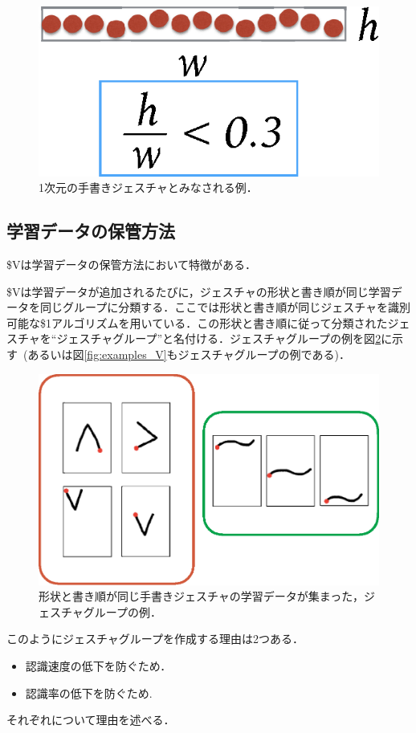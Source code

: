 \begin{figure} [h!]
	\begin{center}
		\includegraphics [width=0.3\hsize ]{img/1D.eps}
	\end{center}
	\caption{1次元の手書きジェスチャとみなされる例．}
	\label{fig:1D}
\end{figure}


\subsection{学習データの保管方法}
\$Vは学習データの保管方法において特徴がある．

\$Vは学習データが追加されるたびに，ジェスチャの形状と書き順が同じ学習データを同じグループに分類する．ここでは形状と書き順が同じジェスチャを識別可能な\$1アルゴリズムを用いている．この形状と書き順に従って分類されたジェスチャを``ジェスチャグループ''と名付ける．ジェスチャグループの例を図\ref{fig:gesture_group}に示す~(あるいは図\ref{fig:examples_V}もジェスチャグループの例である)．

\begin{figure} [h!]
	\begin{center}
		\includegraphics [width=0.7\hsize ]{img/gesture_group.eps}
	\end{center}
	\caption{形状と書き順が同じ手書きジェスチャの学習データが集まった，ジェスチャグループの例．}
	\label{fig:gesture_group}
\end{figure}

このようにジェスチャグループを作成する理由は2つある．
\begin{itemize}
\item 認識速度の低下を防ぐため．
\item 認識率の低下を防ぐため.
\end{itemize}
それぞれについて理由を述べる．


